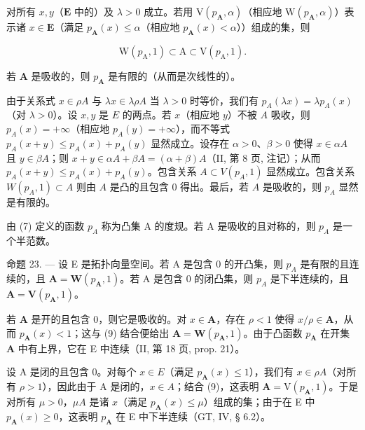 对所有 \(x, y\)（\(\mathbf{E}\) 中的）及 \(\lambda > 0\) 成立。若用 \(\mathrm{V}(p_{\mathbf{A}}, \alpha)\)（相应地 \(\mathrm{W}(p_{\mathbf{A}}, \alpha)\)）表示诸 \(x \in \mathbf{E}\)（满足 \(p_{\mathbf{A}}(x) \leqslant \alpha\)（相应地 \(p_{\mathbf{A}}(x) < \alpha\)））组成的集，则

\[
\mathrm{W} (p _ {\mathrm{A}}, 1) \subset \mathrm{A} \subset \mathrm{V} (p _ {\mathrm{A}}, 1).\tag{9}
\]

若 \(\mathbf{A}\) 是吸收的，则 \(p_{\mathbf{A}}\) 是有限的（从而是次线性的）。

由于关系式 \(x \in \rho A\) 与 \(\lambda x \in \lambda \rho A\) 当 \(\lambda > 0\) 时等价，我们有 \(p_A(\lambda x) = \lambda p_A(x)\)（对 \(\lambda > 0\)）。设 \(x, y\) 是 \(E\) 的两点。若 \(x\)（相应地 \(y\)）不被 \(A\) 吸收，则 \(p_A(x) = +\infty\)（相应地 \(p_A(y) = +\infty\)），而不等式 \(p_A(x + y) \leqslant p_A(x) + p_A(y)\) 显然成立。设存在 \(\alpha > 0\)、\(\beta > 0\) 使得 \(x \in \alpha A\) 且 \(y \in \beta A\)；则 \(x + y \in \alpha A + \beta A = (\alpha + \beta)A\)（II, 第 8 页, 注记）；从而 \(p_A(x + y) \leqslant p_A(x) + p_A(y)\)。包含关系 \(A \subset V(p_A, 1)\) 显然成立。包含关系 \(W(p_A, 1) \subset A\) 则由 \(A\) 是凸的且包含 0 得出。最后，若 \(A\) 是吸收的，则 \(p_A\) 显然是有限的。

由 (7) 定义的函数 \(p_{A}\) 称为凸集 A 的度规。若 A 是吸收的且对称的，则 \(p_{A}\) 是一个半范数。

命题 23. --- 设 E 是拓扑向量空间。若 A 是包含 0 的开凸集，则 \(p_{A}\) 是有限的且连续的，且 \(\mathbf{A} = \mathbf{W}(p_{\mathbf{A}}, 1)\)。若 A 是包含 0 的闭凸集，则 \(p_{A}\) 是下半连续的，且 \(\mathbf{A} = \mathbf{V}(p_{\mathbf{A}}, 1)\)。

若 \(\mathbf{A}\) 是开的且包含 0，则它是吸收的。对 \(x \in \mathbf{A}\)，存在 \(\rho < 1\) 使得 \(x / \rho \in \mathbf{A}\)，从而 \(p_{\mathbf{A}}(x) < 1\)；这与 (9) 结合便给出 \(\mathbf{A} = \mathbf{W}(p_{\mathbf{A}}, 1)\)。由于凸函数 \(p_{\mathbf{A}}\) 在开集 \(\mathbf{A}\) 中有上界，它在 E 中连续（II, 第 18 页, prop. 21）。

设 A 是闭的且包含 0。对每个 \(x \in E\)（满足 \(p_{\mathbf{A}}(x) \leqslant 1\)），我们有 \(x \in \rho A\)（对所有 \(\rho > 1\)），因此由于 A 是闭的，\(x \in A\)；结合 (9)，这表明 \(\mathbf{A} = \mathrm{V}(p_{\mathbf{A}}, 1)\)。于是对所有 \(\mu > 0\)，\(\mu A\) 是诸 \(x\)（满足 \(p_{\mathbf{A}}(x) \leqslant \mu\)）组成的集；由于在 E 中 \(p_{\mathbf{A}}(x) \geqslant 0\)，这表明 \(p_{\mathbf{A}}\) 在 E 中下半连续（GT, IV, § 6.2）。

